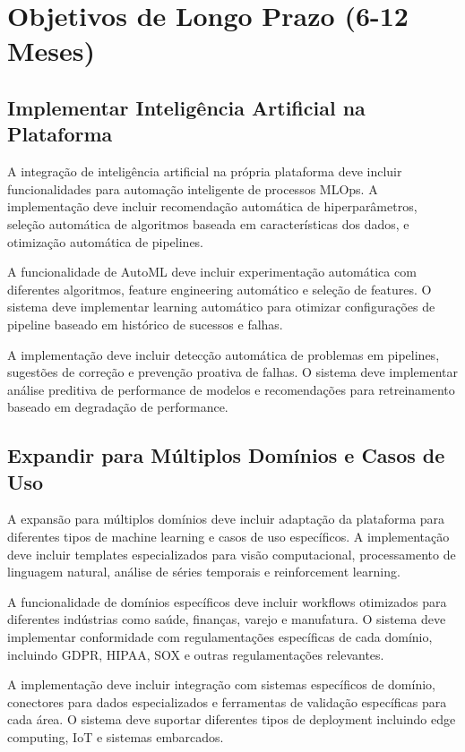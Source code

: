 \documentclass[12pt,a4paper]{article}
\begin{document}
\section{Objetivos de Longo Prazo (6-12 Meses)}

\subsection{Implementar Inteligência Artificial na Plataforma}

A integração de inteligência artificial na própria plataforma deve incluir funcionalidades para automação inteligente de processos MLOps. A implementação deve incluir recomendação automática de hiperparâmetros, seleção automática de algoritmos baseada em características dos dados, e otimização automática de pipelines.

A funcionalidade de AutoML deve incluir experimentação automática com diferentes algoritmos, feature engineering automático e seleção de features. O sistema deve implementar learning automático para otimizar configurações de pipeline baseado em histórico de sucessos e falhas.

A implementação deve incluir detecção automática de problemas em pipelines, sugestões de correção e prevenção proativa de falhas. O sistema deve implementar análise preditiva de performance de modelos e recomendações para retreinamento baseado em degradação de performance.

\subsection{Expandir para Múltiplos Domínios e Casos de Uso}

A expansão para múltiplos domínios deve incluir adaptação da plataforma para diferentes tipos de machine learning e casos de uso específicos. A implementação deve incluir templates especializados para visão computacional, processamento de linguagem natural, análise de séries temporais e reinforcement learning.

A funcionalidade de domínios específicos deve incluir workflows otimizados para diferentes indústrias como saúde, finanças, varejo e manufatura. O sistema deve implementar conformidade com regulamentações específicas de cada domínio, incluindo GDPR, HIPAA, SOX e outras regulamentações relevantes.

A implementação deve incluir integração com sistemas específicos de domínio, conectores para dados especializados e ferramentas de validação específicas para cada área. O sistema deve suportar diferentes tipos de deployment incluindo edge computing, IoT e sistemas embarcados.
\end{document}
